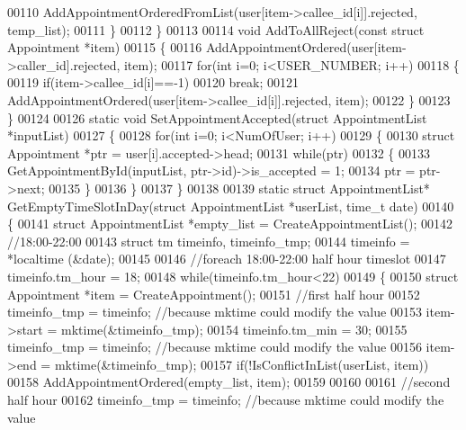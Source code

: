 \begin{DoxyCode}
00110         AddAppointmentOrderedFromList(user[item->callee_id[i]].rejected, temp\_list);
00111     \}
00112 \}
00113 
00114 \textcolor{keywordtype}{void} AddToAllReject(\textcolor{keyword}{const} \textcolor{keyword}{struct} Appointment *item)
00115 \{
00116     AddAppointmentOrdered(user[item->caller_id].rejected, item);
00117     \textcolor{keywordflow}{for}(\textcolor{keywordtype}{int} i=0; i<USER_NUMBER; i++)
00118     \{
00119         \textcolor{keywordflow}{if}(item->callee_id[i]==-1)
00120             \textcolor{keywordflow}{break};
00121         AddAppointmentOrdered(user[item->callee_id[i]].rejected, item);
00122     \}
00123 \}
00124 
00126 \textcolor{keyword}{static} \textcolor{keywordtype}{void} SetAppointmentAccepted(\textcolor{keyword}{struct} AppointmentList *inputList)
00127 \{
00128     \textcolor{keywordflow}{for}(\textcolor{keywordtype}{int} i=0; i<NumOfUser; i++)
00129     \{
00130         \textcolor{keyword}{struct }Appointment *ptr = user[i].accepted->head;
00131         \textcolor{keywordflow}{while}(ptr)
00132         \{
00133             GetAppointmentById(inputList, ptr->id)->is_accepted = 1;
00134             ptr = ptr->next;
00135         \}
00136     \}
00137 \}
00138 
00139 \textcolor{keyword}{static} \textcolor{keyword}{struct }AppointmentList* GetEmptyTimeSlotInDay(\textcolor{keyword}{struct} AppointmentList *userList, time\_t date)
00140 \{
00141     \textcolor{keyword}{struct }AppointmentList *empty\_list = CreateAppointmentList();
00142     \textcolor{comment}{//18:00-22:00}
00143     \textcolor{keyword}{struct }tm timeinfo, timeinfo\_tmp;
00144     timeinfo = *localtime (&date);
00145 
00146     \textcolor{comment}{//foreach 18:00-22:00 half hour timeslot}
00147     timeinfo.tm\_hour = 18;
00148     \textcolor{keywordflow}{while}(timeinfo.tm\_hour<22)
00149     \{
00150         \textcolor{keyword}{struct }Appointment *item = CreateAppointment();
00151         \textcolor{comment}{//first half hour}
00152         timeinfo\_tmp = timeinfo;    \textcolor{comment}{//because mktime could modify the value}
00153         item->start = mktime(&timeinfo\_tmp);
00154         timeinfo.tm\_min = 30;
00155         timeinfo\_tmp = timeinfo;    \textcolor{comment}{//because mktime could modify the value}
00156         item->end = mktime(&timeinfo\_tmp);
00157         \textcolor{keywordflow}{if}(!IsConflictInList(userList, item))
00158             AddAppointmentOrdered(empty\_list, item);
00159 
00160 
00161         \textcolor{comment}{//second half hour}
00162         timeinfo\_tmp = timeinfo;    \textcolor{comment}{//because mktime could modify the value}

\end{DoxyCode}
